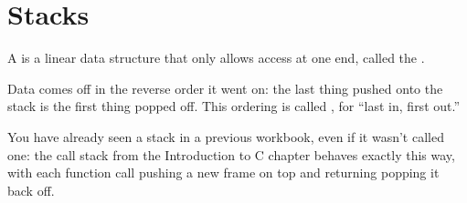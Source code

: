 \chapter{Stacks}

A  is a linear data structure that only allows access at one end, called the . 

Data comes off in the reverse order it went on: the last thing pushed onto the stack is the first thing popped off. This ordering is called , for ``last in, first out.'' 

You have already seen a stack in a previous workbook, even if it wasn't called one: the call stack from the Introduction to C chapter behaves exactly this way, with each function call pushing a new frame on top and returning popping it back off.

